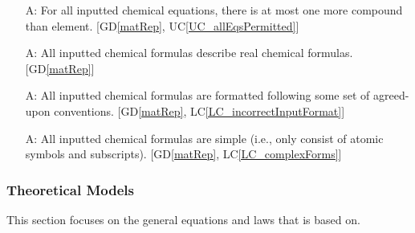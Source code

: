\documentclass[12pt]{article}
\newcommand{\gdref}[1]{GD\ref{#1}}
\newcounter{assumpnum} %
\newcommand{\lcref}[1]{LC\ref{#1}}
\newcommand{\ucref}[1]{UC\ref{#1}}
\begin{document}
\begin{itemize}

  \item[A\refstepcounter{assumpnum}\theassumpnum \label{A_elemCompDiff}:]
    For all inputted chemical equations, there is at most one more compound than
    element. 
    [\gdref{matRep}, \ucref{UC_allEqsPermitted}]

  \item[A\refstepcounter{assumpnum}\theassumpnum \label{A_validInput}:]
    All inputted chemical formulas describe real chemical formulas.
      [\gdref{matRep}]

  \item[A\refstepcounter{assumpnum}\theassumpnum \label{A_correctInputFormat}:]
    All inputted chemical formulas are formatted following some set of
    agreed-upon conventions.	[\gdref{matRep}, \lcref{LC_incorrectInputFormat}]

  \item[A\refstepcounter{assumpnum}\theassumpnum \label{A_simpleForms}:]
    All inputted chemical formulas are simple (i.e., only consist of atomic
    symbols and subscripts).	[\gdref{matRep}, \lcref{LC_complexForms}]

\end{itemize}

\subsubsection{Theoretical Models}\label{sec_theoretical}


This section focuses on the general equations and laws that \progname{} is based
on.
\end{document}
